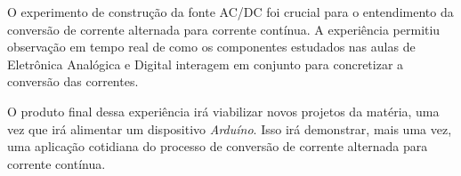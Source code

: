 O experimento de construção da fonte AC/DC foi crucial para o entendimento da conversão de corrente alternada para corrente contínua. A experiência permitiu observação em tempo real de como os componentes estudados nas aulas de Eletrônica Analógica e Digital interagem em conjunto para concretizar a conversão das correntes.
\par
O produto final dessa experiência irá viabilizar novos projetos da matéria, uma vez que irá alimentar um dispositivo \textit{Arduíno}. Isso irá demonstrar, mais uma vez, uma aplicação cotidiana do processo de conversão de corrente alternada para corrente contínua.